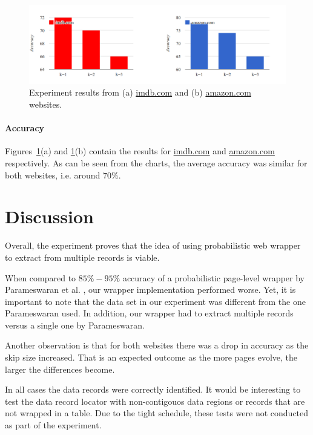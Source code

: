 \begin{figure}[h]
	\centering
	\includegraphics[width=1.0\textwidth]{figures/accuracy}
	\caption{Experiment results from (a) \url{imdb.com} and (b) \url{amazon.com} websites.}
	\label{fig:accuracy}
\end{figure}

\paragraph{Accuracy} Figures~\ref{fig:accuracy}(a) and \ref{fig:accuracy}(b) contain the results for \url{imdb.com} and \url{amazon.com} respectively. As can be seen from the charts, the average accuracy was similar for both websites, i.e. around $70\%$. 


\section{Discussion}

Overall, the experiment proves that the idea of using probabilistic web wrapper to extract from multiple records is viable.

When compared to $85\%-95\%$ accuracy of a probabilistic page-level wrapper by Parameswaran et al. \cite{DBLP:journals/pvldb/ParameswaranDGR11}, our wrapper implementation performed worse. Yet, it is important to note that the data set in our experiment was different from the one Parameswaran used. In addition, our wrapper had to extract multiple records versus a single one by Parameswaran.

Another observation is that for both websites there was a drop in accuracy as the skip size increased. That is an expected outcome as the more pages evolve, the larger the differences become.

In all cases the data records were correctly identified. It would be interesting to test the data record locator with non-contigouos data regions or records that are not wrapped in a table. Due to the tight schedule, these tests were not conducted as part of the experiment.


